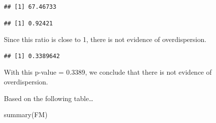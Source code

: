 \documentclass[
]{article}
\newenvironment{Shaded}{\begin{snugshade}}{\end{snugshade}}
\newcommand{\AttributeTok}[1]{\textcolor[rgb]{0.77,0.63,0.00}{#1}}
\newcommand{\CommentTok}[1]{\textcolor[rgb]{0.56,0.35,0.01}{\textit{#1}}}
\newcommand{\ConstantTok}[1]{\textcolor[rgb]{0.00,0.00,0.00}{#1}}
\newcommand{\FloatTok}[1]{\textcolor[rgb]{0.00,0.00,0.81}{#1}}
\newcommand{\FunctionTok}[1]{\textcolor[rgb]{0.00,0.00,0.00}{#1}}
\newcommand{\NormalTok}[1]{#1}
\newcommand{\OtherTok}[1]{\textcolor[rgb]{0.56,0.35,0.01}{#1}}
\newcommand{\SpecialCharTok}[1]{\textcolor[rgb]{0.00,0.00,0.00}{#1}}
\begin{document}
\begin{verbatim}
## [1] 67.46733
\end{verbatim}

\begin{Shaded}
\end{Shaded}

\begin{verbatim}
## [1] 0.92421
\end{verbatim}

Since this ratio is close to 1, there is not evidence of overdispersion.

\begin{Shaded}
\end{Shaded}

\begin{verbatim}
## [1] 0.3389642
\end{verbatim}

With this p-value = 0.3389, we conclude that there is not evidence of
overdispersion.

Based on the following table\ldots{}

\begin{Shaded}
\begin{Highlighting}[]
\FunctionTok{summary}\NormalTok{(FM)}
\end{Highlighting}
\end{Shaded}
\end{document}
